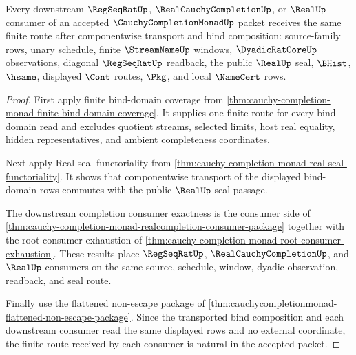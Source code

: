 \begin{theorem}
\label{thm:cauchy-completion-monad-completion-consumer-naturality}
Every downstream $\RegSeqRatUp$, $\RealCauchyCompletionUp$, or $\RealUp$ consumer of an accepted $\CauchyCompletionMonadUp$ packet receives the same finite route after componentwise transport and bind composition: source-family rows, unary schedule, finite $\StreamNameUp$ windows, $\DyadicRatCoreUp$ observations, diagonal $\RegSeqRatUp$ readback, the public $\RealUp$ seal, $\BHist$, $\hsame$, displayed $\Cont$ routes, $\Pkg$, and local $\NameCert$ rows.
\end{theorem}
\begin{proof}
First apply finite bind-domain coverage from \autoref{thm:cauchy-completion-monad-finite-bind-domain-coverage}. It supplies one finite route for every bind-domain read and excludes quotient streams, selected limits, host real equality, hidden representatives, and ambient completeness coordinates.

Next apply Real seal functoriality from \autoref{thm:cauchy-completion-monad-real-seal-functoriality}. It shows that componentwise transport of the displayed bind-domain rows commutes with the public $\RealUp$ seal passage.

The downstream completion consumer exactness is the consumer side of \autoref{thm:cauchy-completion-monad-realcompletion-consumer-package} together with the root consumer exhaustion of \autoref{thm:cauchy-completion-monad-root-consumer-exhaustion}. These results place $\RegSeqRatUp$, $\RealCauchyCompletionUp$, and $\RealUp$ consumers on the same source, schedule, window, dyadic-observation, readback, and seal route.

Finally use the flattened non-escape package of \autoref{thm:cauchycompletionmonad-flattened-non-escape-package}. Since the transported bind composition and each downstream consumer read the same displayed rows and no external coordinate, the finite route received by each consumer is natural in the accepted packet.
\end{proof}

